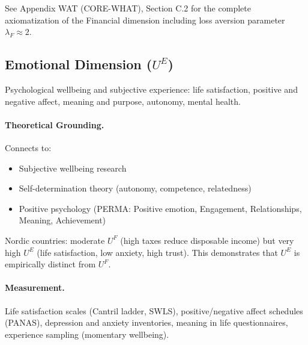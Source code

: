 \begin{cross-reference}
See Appendix WAT (CORE-WHAT), Section C.2 for the complete axiomatization of
the Financial dimension including loss aversion parameter $\lambda_F \approx 2$.
\end{cross-reference}

\subsection{Emotional Dimension ($U^E$)}
\label{sec:fepsde-emotional}

\begin{definition}
Psychological wellbeing and subjective experience: life satisfaction,
positive and negative affect, meaning and purpose, autonomy, mental health.
\end{definition}

\paragraph{Theoretical Grounding.}
Connects to:
\begin{itemize}[nosep]
  \item Subjective wellbeing research \citep{diener1999}
  \item Self-determination theory (autonomy, competence, relatedness)
  \item Positive psychology (PERMA: Positive emotion, Engagement, Relationships, Meaning, Achievement)
\end{itemize}

\begin{intuition}
Nordic countries: moderate $U^F$ (high taxes reduce disposable income)
but very high $U^E$ (life satisfaction, low anxiety, high trust).
This demonstrates that $U^E$ is empirically distinct from $U^F$.
\end{intuition}

\paragraph{Measurement.}
Life satisfaction scales (Cantril ladder, SWLS), positive/negative affect schedules (PANAS),
depression and anxiety inventories, meaning in life questionnaires,
experience sampling (momentary wellbeing).

